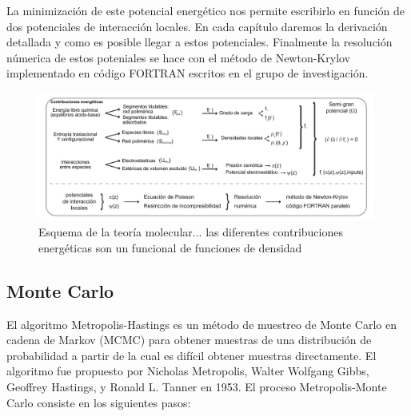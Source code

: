 La minimizaci\'on de este potencial energ\'etico nos permite escribirlo en funci\'on de dos potenciales de interacci\'on locales. En cada cap\'itulo daremos la derivaci\'on detallada y como es posible llegar a estos potenciales. 
Finalmente la resoluci\'on n\'umerica de estos poteniales se hace con el m\'etodo de Newton-Krylov \cite{brown1994convergence} implementado en c\'odigo FORTRAN escritos en el grupo de investigaci\'on.
 \begin{figure}[!htb]
	\centering
	\includegraphics[width=0.99\textwidth]{Figures/TM.pdf}
	\caption{Esquema de la teor\'ia molecular... las diferentes contribuciones energ\'eticas son un funcional de funciones de densidad}
	\label{fig:met:tm_esquema}
\end{figure}


\subsection{Monte Carlo}

El algoritmo Metropolis-Hastings es un m\'etodo de muestreo de Monte Carlo en cadena de Markov (MCMC)  para obtener muestras de una distribuci\'on de probabilidad a partir de la cual es dif\'icil obtener muestras directamente. El algoritmo fue propuesto por Nicholas Metropolis, Walter Wolfgang Gibbs, Geoffrey Hastings, y Ronald L. Tanner en 1953. \cite{metropolis1953rosenbluth}
El proceso Metropolis-Monte Carlo consiste en los siguientes pasos:


